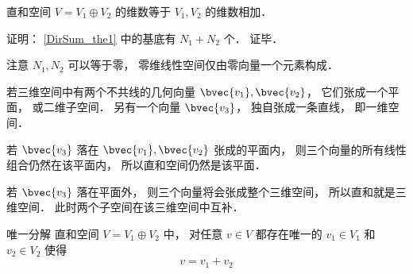\begin{corollary}{}\label{DirSum_cor1}
直和空间 $V = V_1 \oplus V_2$ 的维数等于 $V_1, V_2$ 的维数相加．
\end{corollary}
证明： \autoref{DirSum_the1} 中的基底有 $N_1 + N_2$ 个． 证毕．

注意 $N_1, N_2$ 可以等于零， 零维线性空间仅由零向量一个元素构成．

\begin{example}{}\label{DirSum_ex1}
若三维空间中有两个不共线的几何向量 $\bvec{v_1}, \bvec{v_2}$， 它们张成一个平面， 或二维子空间． 另有一个向量 $\bvec{v_3}$， 独自张成一条直线， 即一维空间．

若 $\bvec{v_3}$ 落在 $\bvec{v_1}, \bvec{v_2}$ 张成的平面内， 则三个向量的所有线性组合仍然在该平面内， 所以直和空间仍然是该平面．

若 $\bvec{v_3}$ 落在平面外， 则三个向量将会张成整个三维空间， 所以直和就是三维空间． 此时两个子空间在该三维空间中互补．
\end{example}


\begin{theorem}{唯一分解}
直和空间 $V = V_1 \oplus V_2$ 中， 对任意 $v \in V$ 都存在唯一的 $v_1 \in V_1$ 和 $v_2 \in V_2$ 使得
\begin{equation}
v = v_1 + v_2
\end{equation}
\end{theorem}
